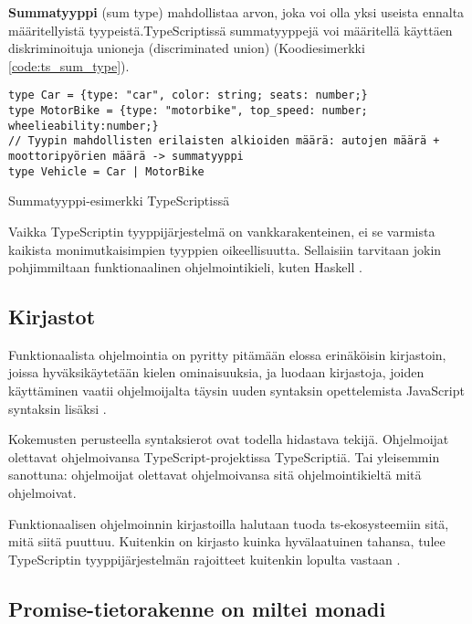 \textbf{Summatyyppi} (sum type) mahdollistaa arvon, joka voi olla yksi useista ennalta määritellyistä tyypeistä.TypeScriptissä summatyyppejä voi määritellä käyttäen diskriminoituja unioneja (discriminated union) (Koodiesimerkki \ref{code:ts_sum_type}). \citep{algebraic_data_types,holvikari2021category}

\begin{code}
    \begin{verbatim}
type Car = {type: "car", color: string; seats: number;}
type MotorBike = {type: "motorbike", top_speed: number; wheelieability:number;}
// Tyypin mahdollisten erilaisten alkioiden määrä: autojen määrä + moottoripyörien määrä -> summatyyppi
type Vehicle = Car | MotorBike
\end{verbatim}
    \caption{Summatyyppi-esimerkki TypeScriptissä}
    \label{code:ts_sum_type}
\end{code}


Vaikka TypeScriptin tyyppijärjestelmä on vankkarakenteinen, ei se varmista kaikista monimutkaisimpien tyyppien oikeellisuutta. Sellaisiin tarvitaan jokin pohjimmiltaan funktionaalinen ohjelmointikieli, kuten Haskell \cite{holvikari2021category}.

\subsection{Kirjastot}

Funktionaalista ohjelmointia on pyritty pitämään elossa erinäköisin kirjastoin, joissa hyväksikäytetään kielen ominaisuuksia, ja luodaan kirjastoja, joiden käyttäminen vaatii ohjelmoijalta täysin uuden syntaksin opettelemista JavaScript syntaksin lisäksi \cite{ramda,sanctuary,crocks,fpts}.

Kokemusten perusteella syntaksierot ovat todella hidastava tekijä. Ohjelmoijat olettavat ohjelmoivansa TypeScript-projektissa TypeScriptiä. Tai yleisemmin sanottuna: ohjelmoijat olettavat ohjelmoivansa sitä ohjelmointikieltä mitä ohjelmoivat.

Funktionaalisen ohjelmoinnin kirjastoilla halutaan tuoda \gls{ts}-ekosysteemiin sitä, mitä siitä puuttuu. Kuitenkin on kirjasto kuinka hyvälaatuinen tahansa, tulee TypeScriptin tyyppijärjestelmän rajoitteet kuitenkin lopulta vastaan \cite{holvikari2021category}.



\subsection{Promise-tietorakenne on miltei monadi}


